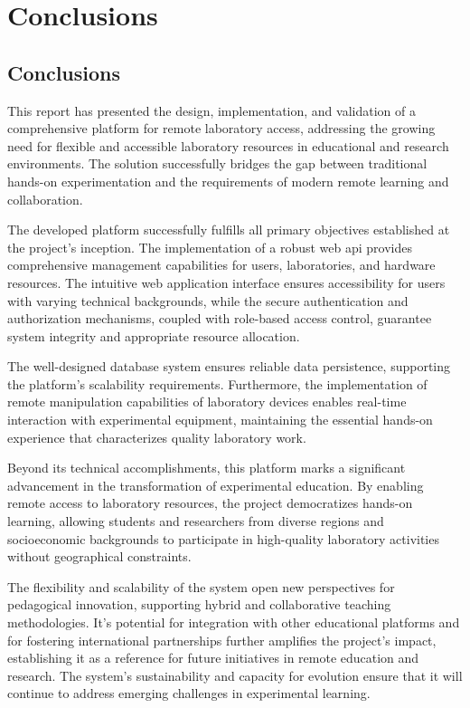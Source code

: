 \chapter{Conclusions}
\label{cap:conclusions}
\let\cleardoublepage\clearpage

\section{Conclusions}
\label{sec:conclusions}

This report has presented the design, implementation, and validation of a comprehensive platform for remote laboratory access, addressing the growing need for flexible and accessible laboratory resources in educational and research environments. The solution successfully bridges the gap between traditional hands-on experimentation and the requirements of modern remote learning and collaboration.

The developed platform successfully fulfills all primary objectives established at the project's inception. The implementation of a robust web \ac{api} provides comprehensive management capabilities for users, laboratories, and hardware resources. The intuitive web application interface ensures accessibility for users with varying technical backgrounds, while the secure authentication and authorization mechanisms, coupled with role-based access control, guarantee system integrity and appropriate resource allocation.

The well-designed database system ensures reliable data persistence, supporting the platform's scalability requirements. Furthermore, the implementation of remote manipulation capabilities of laboratory devices enables real-time interaction with experimental equipment, maintaining the essential hands-on experience that characterizes quality laboratory work.

Beyond its technical accomplishments, this platform marks a significant advancement in the transformation of experimental education. By enabling remote access to laboratory resources, the project democratizes hands-on learning, allowing students and researchers from diverse regions and socioeconomic backgrounds to participate in high-quality laboratory activities without geographical constraints.

The flexibility and scalability of the system open new perspectives for pedagogical innovation, supporting hybrid and collaborative teaching methodologies. It's potential for integration with other educational platforms and for fostering international partnerships further amplifies the project's impact, establishing it as a reference for future initiatives in remote education and research. The system's sustainability and capacity for evolution ensure that it will continue to address emerging challenges in experimental learning.

